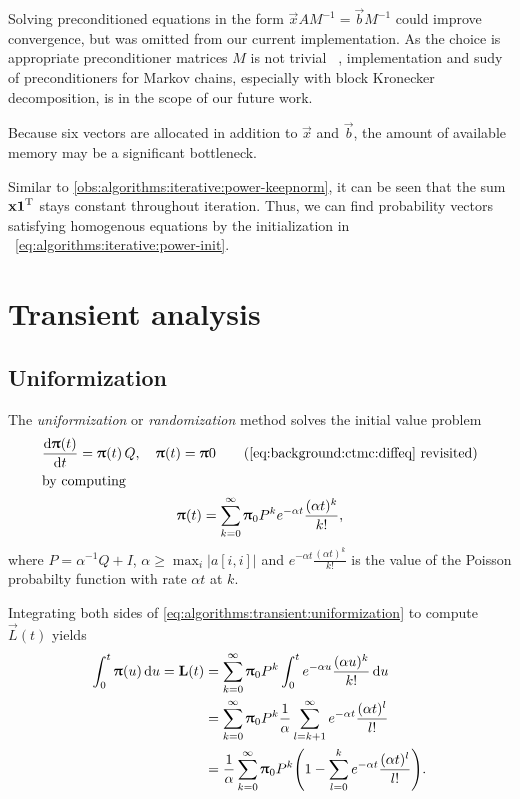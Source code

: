 Solving preconditioned equations in the form
$\vec{x} A M^{-1} = \vec{b} M^{-1}$ could improve convergence, but was
omitted from our current implementation. As the choice is appropriate
preconditioner matrices $M$ is not trivial%
~\citep{DBLP:journals/informs/LangvilleS04}, implementation and sudy
of preconditioners for Markov chains, especially with block Kronecker
decomposition, is in the scope of our future work.

Because six vectors are allocated in addition to $\vec{x}$ and
$\vec{b}$, the amount of available memory may be a significant
bottleneck. 

Similar to \vref{obs:algorithms:iterative:power-keepnorm}, it can be
seen that the sum $\bm{\mathrm{x}} \bm{\mathrm{1}}^{\mathrm{T}}$ stays constant throughout
 iteration. Thus, we can find probability vectors
satisfying homogenous equations by the initialization in%
~\vref{eq:algorithms:iterative:power-init}.

\section{Transient analysis}

\subsection{Uniformization}
\label{ssec:algorithms:uniformization}

The \emph{uniformization} or \emph{randomization} method solves the
initial value problem
\begin{gather}
  \frac{\dd \vec{\uppi}(t)}{\dd t} = \vec{\uppi}(t) \, Q, \quad
  \vec{\uppi}(t) = \vec{\uppi}{0}
  \tag{\ref{eq:background:ctmc:diffeq}~revisited}\\
  \shortintertext{by computing}
  \vec{\uppi}(t) = \sum_{k = 0}^{\infty} \vec{\uppi}_0 P^k e^{-\alpha
    t} \frac{(\alpha t)^k}{k!}\text,
  \label{eq:algorithms:transient:uniformization}
\end{gather}
where $P = \alpha^{-1} Q + I$,
$\alpha \ge \max_{i} \lvert a[i, i] \rvert$ and
$e^{-\alpha t} \frac{(\alpha t)^k}{k!}$ is the value of the Poisson
probabilty function with rate $\alpha t$ at $k$.

Integrating both sides of
\vref{eq:algorithms:transient:uniformization} to compute $\vec{L}(t)$
yields~\citep{reibman1989markov}
\begin{align}
  \int_{0}^t \vec{\uppi}(u) \,\dd u = \vec{L}(t)
  &= \sum_{k = 0}^{\infty} \vec{\uppi}_0 P^k \int_{0}^{t} e^{-\alpha
    u} \frac{(\alpha u)^k}{k!} \,\dd u \\
  &= \sum_{k = 0}^{\infty} \vec{\uppi}_0 P^k \frac{1}{\alpha} \sum_{l
    = k + 1}^{\infty} e^{-\alpha t} \frac{(\alpha t)^l}{l!} \\
  &= \frac{1}{\alpha} \sum_{k = 0}^{\infty} \vec{\uppi}_0 P^k \mleft(
    1 - \sum_{l = 0}^{k} e^{-\alpha t} \frac{(\alpha t)^l}{l!}
    \mright) \text.
    \label{eq:algorithms:transient:aggregate-uniformization}
\end{align}

